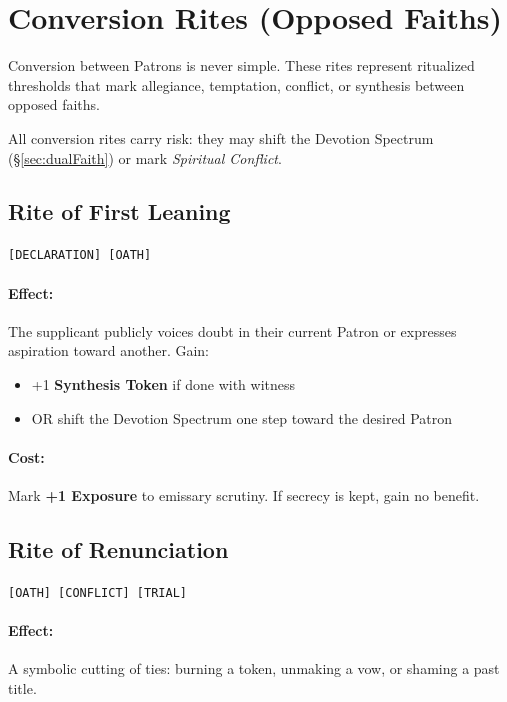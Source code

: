 \documentclass[11pt]{article}
\begin{document}
\section{Conversion Rites (Opposed Faiths)}
\label{sec:conversionRites}

Conversion between Patrons is never simple.
These rites represent ritualized thresholds that mark allegiance,
temptation, conflict, or synthesis between opposed faiths.

All conversion rites carry risk: they may shift the Devotion Spectrum
(\S\ref{sec:dualFaith}) or mark \emph{Spiritual Conflict}.

\subsection*{Rite of First Leaning}
 \quad \texttt{[DECLARATION] [OATH]}

\paragraph{Effect:}
The supplicant publicly voices doubt in their current Patron or expresses
aspiration toward another. Gain:
\begin{itemize}
  \item +1 \textbf{Synthesis Token} if done with witness
  \item OR shift the Devotion Spectrum one step toward the desired Patron
\end{itemize}

\paragraph{Cost:}
Mark \textbf{+1 Exposure} to emissary scrutiny.
If secrecy is kept, gain no benefit.

\subsection*{Rite of Renunciation}
 \quad \texttt{[OATH] [CONFLICT] [TRIAL]}

\paragraph{Effect:}
A symbolic cutting of ties: burning a token, unmaking a vow, or shaming
a past title.
\end{document}
